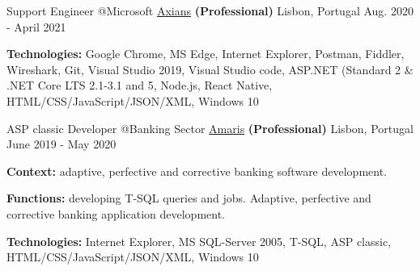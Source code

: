 \begin{cventries}
  \cventry
    {Support Engineer @Microsoft} %
    {\href{https://www.axians.pt/pt/}{Axians} \textbf{(Professional)}} %
    {Lisbon, Portugal} %
    {Aug. 2020 - April 2021} %
    {
      \begin{cvitems} %
		\item[] {\textbf{Technologies:} 
		\textcolor{rainbowcolor-olive}{Google Chrome}, 
		\textcolor{rainbowcolor-olive}{MS Edge}, 
		\textcolor{rainbowcolor-olive}{Internet Explorer},
		\textcolor{rainbowcolor-olive}{Postman},
		\textcolor{rainbowcolor-olive}{Fiddler}, 
		\textcolor{rainbowcolor-olive}{Wireshark},		
		\textcolor{rainbowcolor-olive}{Git},    
		\textcolor{rainbowcolor-olive}{Visual Studio 2019}, 
		\textcolor{rainbowcolor-olive}{Visual Studio code}, 
		\textcolor{rainbowcolor-indigo}{ASP.NET (Standard 2 \& .NET Core LTS 2.1-3.1 and 5}, 
		\textcolor{rainbowcolor-indigo}{Node.js}, 
		\textcolor{rainbowcolor-indigo}{React Native}, 
		\textcolor{rainbowcolor-indigo}{HTML/CSS/JavaScript/JSON/XML}, 		
		\textcolor{rainbowcolor-orange}{Windows 10}}			
      \end{cvitems}		
    } 

  \cventry
    {ASP classic Developer @Banking Sector %
  } %
    {\href{https://www.amaris.com/}{Amaris} \textbf{(Professional)}} %
    {Lisbon, Portugal} %
    {June 2019 - May 2020} %
    {
      \begin{cvitems} %
		\item[] {\textbf{Context:} adaptive, perfective and corrective banking software development. 
}
		\item[] {\textbf{Functions:} developing T-SQL queries and jobs. Adaptive, perfective and corrective banking application development.}		
		\item[] {\textbf{Technologies:} 
		\textcolor{rainbowcolor-olive}{Internet Explorer}, 
		\textcolor{rainbowcolor-olive}{MS SQL-Server 2005}, 
		\textcolor{rainbowcolor-indigo}{T-SQL}, 
		\textcolor{rainbowcolor-indigo}{ASP classic}, 
		\textcolor{rainbowcolor-indigo}{HTML/CSS/JavaScript/JSON/XML}, 
		\textcolor{rainbowcolor-orange}{Windows 10}}		
      \end{cvitems}
    } 
    

\end{cventries}
